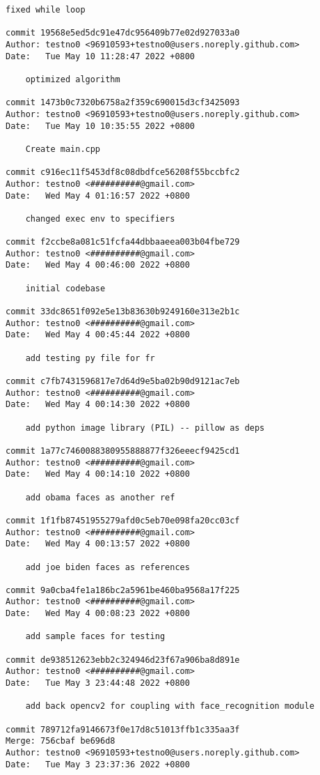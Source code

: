 \documentclass[12pt]{article}
\begin{document}
\begin{lstlisting}[caption={\texttt{git} log of the development.}]
	fixed while loop

commit 19568e5ed5dc91e47dc956409b77e02d927033a0
Author: testno0 <96910593+testno0@users.noreply.github.com>
Date:   Tue May 10 11:28:47 2022 +0800

	optimized algorithm

commit 1473b0c7320b6758a2f359c690015d3cf3425093
Author: testno0 <96910593+testno0@users.noreply.github.com>
Date:   Tue May 10 10:35:55 2022 +0800

	Create main.cpp

commit c916ec11f5453df8c08dbdfce56208f55bccbfc2
Author: testno0 <##########@gmail.com>
Date:   Wed May 4 01:16:57 2022 +0800

	changed exec env to specifiers

commit f2ccbe8a081c51fcfa44dbbaaeea003b04fbe729
Author: testno0 <##########@gmail.com>
Date:   Wed May 4 00:46:00 2022 +0800

	initial codebase

commit 33dc8651f092e5e13b83630b9249160e313e2b1c
Author: testno0 <##########@gmail.com>
Date:   Wed May 4 00:45:44 2022 +0800

	add testing py file for fr

commit c7fb7431596817e7d64d9e5ba02b90d9121ac7eb
Author: testno0 <##########@gmail.com>
Date:   Wed May 4 00:14:30 2022 +0800
	
	add python image library (PIL) -- pillow as deps

commit 1a77c7460088380955888877f326eeecf9425cd1
Author: testno0 <##########@gmail.com>
Date:   Wed May 4 00:14:10 2022 +0800

	add obama faces as another ref

commit 1f1fb87451955279afd0c5eb70e098fa20cc03cf
Author: testno0 <##########@gmail.com>
Date:   Wed May 4 00:13:57 2022 +0800

	add joe biden faces as references

commit 9a0cba4fe1a186bc2a5961be460ba9568a17f225
Author: testno0 <##########@gmail.com>
Date:   Wed May 4 00:08:23 2022 +0800

	add sample faces for testing

commit de938512623ebb2c324946d23f67a906ba8d891e
Author: testno0 <##########@gmail.com>
Date:   Tue May 3 23:44:48 2022 +0800

	add back opencv2 for coupling with face_recognition module

commit 789712fa9146673f0e17d8c51013ffb1c335aa3f
Merge: 756cbaf be696d8
Author: testno0 <96910593+testno0@users.noreply.github.com>
Date:   Tue May 3 23:37:36 2022 +0800


\end{lstlisting}
\end{document}
